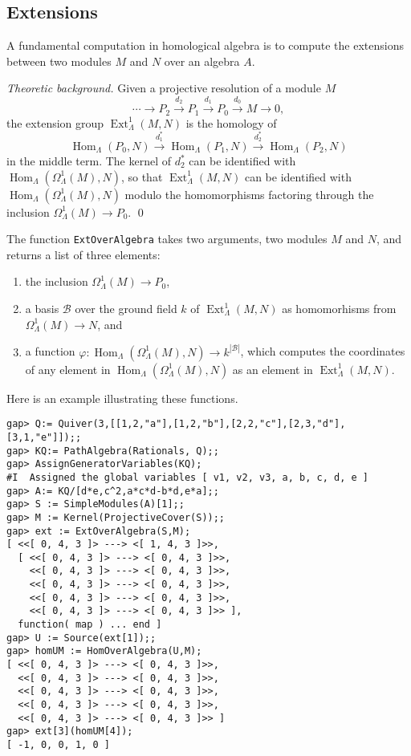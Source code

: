 \documentclass{amsart}
\newcommand{\Hom}{\operatorname{Hom}\nolimits}
\newcommand{\Ext}{\operatorname{Ext}\nolimits}
\theoremstyle{definition}
\newcommand{\code}[1]{\texttt{#1}}
\theoremstyle{theoretic}
\newenvironment{theoback}
{\medskip\small\textit{Theoretic background.} }
{\qed\par\medskip}
\begin{document}
\subsection{Extensions}
A fundamental computation in homological algebra is to compute the
extensions between two modules $M$ and $N$ over an algebra $A$.

\begin{theoback} 
Given a projective resolution of a module $M$ 
\[\cdots\to P_2\xrightarrow{d_2} P_1\xrightarrow{d_1}
P_0\xrightarrow{d_0} M\to 0,\]
the extension group $\Ext^1_\Lambda(M,N)$ is the homology 
of 
\[\Hom_\Lambda(P_0,N)\xrightarrow{d_1^*} \Hom_\Lambda(P_1,N)
\xrightarrow{d_2^*} \Hom_\Lambda(P_2,N)
\]
in the middle term.  The kernel of $d_2^*$ can be identified with
$\Hom_\Lambda(\Omega^1_\Lambda(M),N)$, so that $\Ext^1_\Lambda(M,N)$
can be identified with $\Hom_\Lambda(\Omega^1_\Lambda(M),N)$ modulo
the homomorphisms factoring through the inclusion
$\Omega^1_\Lambda(M)\to P_0$.  
\end{theoback}

The function \code{ExtOverAlgebra} takes two arguments, two modules
$M$ and $N$, and returns a list of three elements: 
\begin{enumerate}[\rm(1)]
\item the inclusion $\Omega^1_\Lambda(M)\to P_0$, 
\item a basis $\mathcal{B}$ over the ground field $k$ of
  $\Ext^1_\Lambda(M,N)$ as homomorhisms from $\Omega^1_\Lambda(M)\to
  N$, and 
\item a function $\varphi\colon \Hom_\Lambda(\Omega^1_\Lambda(M),N)
  \to k^{|\mathcal{B}|}$, which computes the coordinates of any
  element in $\Hom_\Lambda(\Omega^1_\Lambda(M),N)$  as an element in 
$\Ext^1_\Lambda(M,N)$. 
\end{enumerate}

Here is an example illustrating these functions.

\begin{verbatim}
gap> Q:= Quiver(3,[[1,2,"a"],[1,2,"b"],[2,2,"c"],[2,3,"d"],
[3,1,"e"]]);;
gap> KQ:= PathAlgebra(Rationals, Q);;
gap> AssignGeneratorVariables(KQ);
#I  Assigned the global variables [ v1, v2, v3, a, b, c, d, e ]
gap> A:= KQ/[d*e,c^2,a*c*d-b*d,e*a];;
gap> S := SimpleModules(A)[1];;
gap> M := Kernel(ProjectiveCover(S));;
gap> ext := ExtOverAlgebra(S,M);
[ <<[ 0, 4, 3 ]> ---> <[ 1, 4, 3 ]>>, 
  [ <<[ 0, 4, 3 ]> ---> <[ 0, 4, 3 ]>>,
    <<[ 0, 4, 3 ]> ---> <[ 0, 4, 3 ]>>, 
    <<[ 0, 4, 3 ]> ---> <[ 0, 4, 3 ]>>,
    <<[ 0, 4, 3 ]> ---> <[ 0, 4, 3 ]>>, 
    <<[ 0, 4, 3 ]> ---> <[ 0, 4, 3 ]>> ],
  function( map ) ... end ]
gap> U := Source(ext[1]);;
gap> homUM := HomOverAlgebra(U,M);
[ <<[ 0, 4, 3 ]> ---> <[ 0, 4, 3 ]>>,
  <<[ 0, 4, 3 ]> ---> <[ 0, 4, 3 ]>>, 
  <<[ 0, 4, 3 ]> ---> <[ 0, 4, 3 ]>>,
  <<[ 0, 4, 3 ]> ---> <[ 0, 4, 3 ]>>, 
  <<[ 0, 4, 3 ]> ---> <[ 0, 4, 3 ]>> ]
gap> ext[3](homUM[4]);
[ -1, 0, 0, 1, 0 ]
\end{verbatim}
\end{document}
